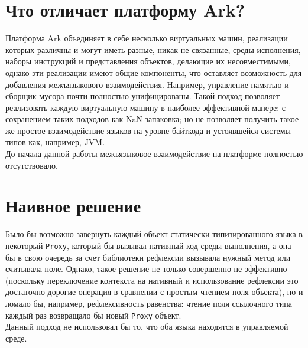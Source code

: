 \documentclass[times,specification,annotation]{itmo-student-thesis}
\begin{document}
\section{Что отличает платформу Ark?}
Платформа Ark объединяет в себе несколько виртуальных машин, реализации которых различны и могут иметь разные, никак не связанные, среды исполнения, наборы инструкций и представления объектов, делающие их несовместимыми, однако эти реализации имеют общие компоненты, что оставляет возможность для добавления межъязыкового взаимодействия. Например, управление памятью и сборщик мусора почти полностью унифицированы. Такой подход позволяет реализовать каждую виртуальную машину в наиболее эффективной манере: с сохранением таких подходов как NaN запаковка; но не позволяет получить такое же простое взаимодействие языков на уровне байткода и устоявшейся системы типов как, например, JVM.\\
До начала данной работы межъязыковое взаимодействие на платформе полностью отсутствовало.

\section{Наивное решение}
Было бы возможно завернуть каждый объект статически типизированного языка в некоторый \texttt{Proxy}, который бы вызывал нативный код среды выполнения, а она бы в свою очередь за счет библиотеки рефлексии вызывала нужный метод или считывала поле. Однако, такое решение не только совершенно не эффективно (поскольку переключение контекста на нативный и использование рефлексии это достаточно дорогие операция в сравнении с простым чтением поля объекта), но и ломало бы, например, рефлексивность равенства: чтение поля ссылочного типа каждый раз возвращало бы новый \texttt{Proxy} объект.\\
Данный подход не использовал бы то, что оба языка находятся в управляемой среде.
\end{document}
